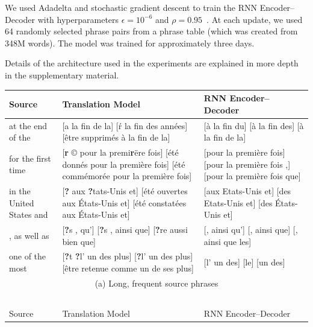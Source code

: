 We used Adadelta and stochastic gradient descent to train the RNN
Encoder--Decoder with hyperparameters $\epsilon=10^{-6}$ and
$\rho=0.95$~\mbox{\cite{Zeiler-2012}}. At each update, we used 64 randomly
selected phrase pairs from a phrase table (which was created from 348M words).
The model was trained for approximately three days.

Details of the architecture used in the experiments are explained in more depth
in the supplementary material.

\begin{table}[t]
    \centering
    \small
    \begin{tabular}{p{} | p{} | p{}}
        \hline
        Source & Translation Model & RNN Encoder--Decoder \\
        \hline\hline
        at the end of the & 
[a la fin de la] [ŕ la fin des années] [être supprimés à la fin de la] &
[à la fin du] [à la fin des] [à la fin de la]
        \\
        \hline
        for the first time &
        [{\bf r} © pour la premi{\bf r}\"ere fois] [été donnés pour la première fois] [été commémorée pour la première fois] & 
[pour la première fois] [pour la première fois ,] [pour la première fois que]  
        \\
        \hline
        in the United States and
        &
        [{\bf ?} aux  {\bf ?}tats-Unis et] [été ouvertes aux États-Unis et] [été constatées aux États-Unis et] &
[aux Etats-Unis et] [des Etats-Unis et] [des États-Unis et]
        \\
        \hline
        , as well as
        &
        [{\bf ?}s , qu'] [{\bf ?}s , ainsi que] [{\bf ?}re aussi bien que] & 
[, ainsi qu'] [, ainsi que] [, ainsi que les]  
        \\
        \hline
        one of the most
        &
[{\bf ?}t {\bf ?}l' un des plus] [{\bf ?}l' un des plus] [être retenue comme un de ses plus] &
[l' un des] [le] [un des]
        \\
        \hline
        \multicolumn{3}{c}{(a) Long, frequent source phrases}\\
        \multicolumn{3}{c}{~}\\
        \hline
        Source & Translation Model & RNN Encoder--Decoder \\

\end{tabular}
\end{table}
